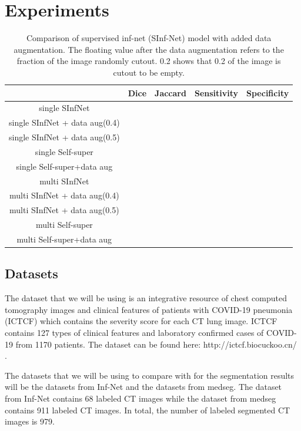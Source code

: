 \section{Experiments}

\begin{table}
	\centering
	\begin{tabular}{|c|c|c|c|c|} \hline
		& Dice & Jaccard & Sensitivity & Specificity \\\hline
		single SInfNet & & & & \\\hline
		single SInfNet + data aug(0.4) & & & & \\\hline
		single SInfNet + data aug(0.5) & & & & \\\hline \hline
		single Self-super & & & & \\\hline
		single Self-super+data aug & & & & \\\hline \hline
		multi SInfNet & & & & \\\hline
		multi SInfNet + data aug(0.4) & & & & \\\hline
		multi SInfNet + data aug(0.5) & & & & \\\hline \hline
		multi Self-super & & & & \\\hline
		multi Self-super+data aug & & & & \\\hline \hline
		
	\end{tabular}
	\caption{Comparison of supervised inf-net (SInf-Net) model with added data augmentation.  The floating value  after the data augmentation refers to the fraction of the image randomly cutout. 0.2 shows that 0.2 of the image is cutout to be empty. }
\end{table}

\subsection{Datasets}
The dataset that we will be using is an integrative resource of chest computed tomography images and clinical features of patients with COVID-19 pneumonia (ICTCF) \cite{ref23} which contains the severity score for each CT lung image. ICTCF contains 127 types of clinical features and laboratory confirmed cases of COVID-19 from 1170 patients. The dataset can be found here: http://ictcf.biocuckoo.cn/ . 

The datasets that we will be using to compare with for the segmentation results will be the datasets from Inf-Net\cite{ref14} and the datasets from medseg\cite{ref26}. The dataset from Inf-Net\cite{ref14} contains 68 labeled CT images while the dataset from medseg contains 911 labeled CT images. In total, the number of labeled segmented CT images is 979.

